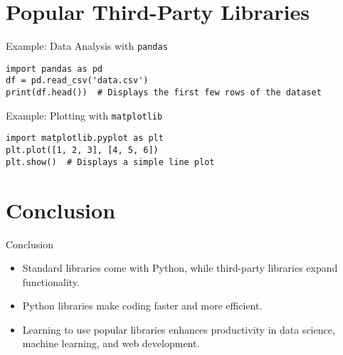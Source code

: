 \documentclass[serif, aspectratio=169]{beamer}
\begin{document}
\section{Popular Third-Party Libraries}

\begin{frame}[fragile]{Example: Data Analysis with \texttt{pandas}}
    \begin{lstlisting}
import pandas as pd
df = pd.read_csv('data.csv')
print(df.head())  # Displays the first few rows of the dataset
    \end{lstlisting}
\end{frame}

\begin{frame}[fragile]{Example: Plotting with \texttt{matplotlib}}
    \begin{lstlisting}
import matplotlib.pyplot as plt
plt.plot([1, 2, 3], [4, 5, 6])
plt.show()  # Displays a simple line plot
    \end{lstlisting}
\end{frame}

\section{Conclusion}

\begin{frame}{Conclusion}
    \begin{itemize}
        \item Standard libraries come with Python, while third-party libraries expand functionality.
        \item Python libraries make coding faster and more efficient.
        \item Learning to use popular libraries enhances productivity in data science, machine learning, and web development.
    \end{itemize}
\end{frame}
\end{document}
